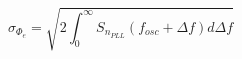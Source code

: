 		\begin{equation}\label{eq:rpm}
			\sigma_{\Phi_e} = \sqrt{2\int_0^\infty S_{n_{PLL}}(f_{osc} + \Delta f)d\Delta f}
		\end{equation}

